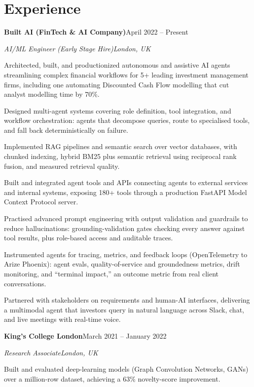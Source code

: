 \documentclass[10pt,a4paper]{article}
\newcommand{\entry}[4]{%
  {\color{company}\bfseries #1}\hfill {\color{muted}#2}\par
  \vspace{1pt}
  {\itshape #3}\hfill {\color{muted}\itshape #4}\par
  \vspace{3pt}%
}
\begin{document}
\section{Experience}
\entry{Built AI (FinTech \& AI Company)}{April 2022 -- Present}{AI/ML Engineer (Early Stage Hire)}{London, UK}
\begin{tight}
  \item Architected, built, and productionized autonomous and assistive AI agents streamlining complex financial workflows for 5+ leading investment management firms, including one automating Discounted Cash Flow modelling that cut analyst modelling time by 70\%.
  \item Designed multi-agent systems covering role definition, tool integration, and workflow orchestration: agents that decompose queries, route to specialised tools, and fall back deterministically on failure.
  \item Implemented RAG pipelines and semantic search over vector databases, with chunked indexing, hybrid BM25 plus semantic retrieval using reciprocal rank fusion, and measured retrieval quality.
  \item Built and integrated agent tools and APIs connecting agents to external services and internal systems, exposing 180+ tools through a production FastAPI Model Context Protocol server.
  \item Practised advanced prompt engineering with output validation and guardrails to reduce hallucinations: grounding-validation gates checking every answer against tool results, plus role-based access and auditable traces.
  \item Instrumented agents for tracing, metrics, and feedback loops (OpenTelemetry to Arize Phoenix): agent evals, quality-of-service and groundedness metrics, drift monitoring, and ``terminal impact,'' an outcome metric from real client conversations.
  \item Partnered with stakeholders on requirements and human-AI interfaces, delivering a multimodal agent that investors query in natural language across Slack, chat, and live meetings with real-time voice.
\end{tight}

\entry{King's College London}{March 2021 -- January 2022}{Research Associate}{London, UK}
\begin{tight}
  \item Built and evaluated deep-learning models (Graph Convolution Networks, GANs) over a million-row dataset, achieving a 63\% novelty-score improvement.
\end{tight}
\end{document}
